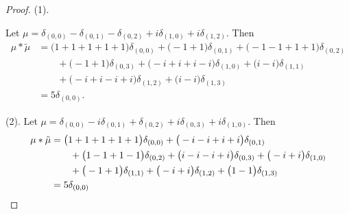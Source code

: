 \begin{proof}
(1). 

Let  $\mu =  \delta_{(0,0)}-\delta_{(0,1)}-\delta_{(0,2)}+i\delta_{(1,0)}+i\delta_{(1,2)}
$.  Then 
\begin{align*} 
\mu * \tilde \mu & = \big(1+1+1+1+1\big)\delta_{(0,0)}
+\big(-1+1\big)\delta_{(0,1)}
+\big(-1-1+1+1\big)\delta_{(0,2)}
\\&\qquad
+\big(-1+1\big)\delta_{(0,3)}
+\big(-i+i+i-i\big)\delta_{(1,0)}
+\big(i-i\big)\delta_{(1,1)}
\\&\qquad
+\big(-i+i-i+i\big)\delta_{(1,2)}
+\big(i-i\big)\delta_{(1,3)}\\&=5\delta_{(0 , 0)}.
\end{align*}
 
 (2). 
Let  $\mu =  \delta_{(0,0)}-i\delta_{(0,1)}+\delta_{(0,2)}+i\delta_{(0,3)}+i\delta_{(1,0)}
$.  Then 
\begin{align*} 
\mu * \tilde \mu & = \big(1+1+1+1+1\big)\delta_{(0,0)}
+\big(-i-i+i+i\big)\delta_{(0,1)}
\\&\qquad
+\big(1-1+1-1\big)\delta_{(0,2)}
+\big(i-i-i+i\big)\delta_{(0,3)}
+\big(-i+i\big)\delta_{(1,0)}
\\&\qquad
+\big(-1+1\big)\delta_{(1,1)}
+\big(-i+i\big)\delta_{(1,2)}
+\big(1-1\big)\delta_{(1,3)}\\&=5\delta_{(0 , 0)}\qedhere
\end{align*}
\end{proof}



